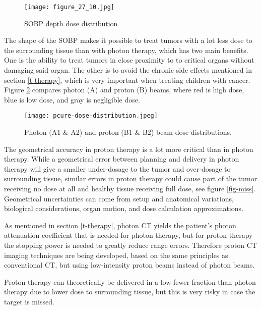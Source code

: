 \documentclass[../main/thesis.tex]{subfiles}
\begin{document}
\begin{figure}%
	\centering
	\texttt{[image: figure\_27\_10.jpg]}
	\caption{\gls{SOBP} depth dose distribution \citep[fig. 27.10]{Khan}}
	\label{fig-sobp}
\end{figure}


The shape of the \gls{SOBP} makes it possible to treat tumors with a lot less dose to the surrounding tissue than with photon therapy, which has two main benefits. One is the ability to treat tumors in close proximity to to critical organs without damaging said organ. The other is to avoid the chronic side effects mentioned in section \ref{t-therapy}, which is very important when treating children with cancer. \citep[chap. 27]{Khan} Figure \ref{fig-photonproton-dose} compares photon (A) and proton (B) beams, where red is high dose, blue is low dose, and gray is negligible dose. 

\begin{figure}%
	\centering
	\texttt{[image: pcure-dose-distribution.jpeg]}
	\caption{Photon (A1 \& A2) and proton (B1 \& B2) beam dose distributions. \citetext{\citeauthor{pcure}}}
	\label{fig-photonproton-dose}
\end{figure}

The geometrical accuracy in proton therapy is a lot more critical than in photon therapy. While a geometrical error between planning and delivery in photon therapy will give a smaller under-dosage to the tumor and over-dosage to surrounding tissue, similar errors in proton therapy could cause part of the tumor receiving no dose at all and healthy tissue receiving full dose, see figure \ref{fig-miss}. Geometrical uncertainties can come from setup and anatomical variations, biological considerations, organ motion, and dose calculation approximations. \citep{Paganetti-range} 

As mentioned in section \ref{t-therapy}, photon \gls{CT} yields the patient's photon attenuation coefficient that is needed for photon therapy, but for proton therapy the stopping power is needed to greatly reduce range errors. Therefore proton \gls{CT} imaging techniques are being developed, based on the same principles as conventional \gls{CT}, but using low-intensity proton beams instead of photon beams. \citep{proton-ct}

Proton therapy can theoretically be delivered in a low fewer fraction than photon therapy due to lower dose to surrounding tissue, but this is very risky in case the target is missed.
\end{document}
